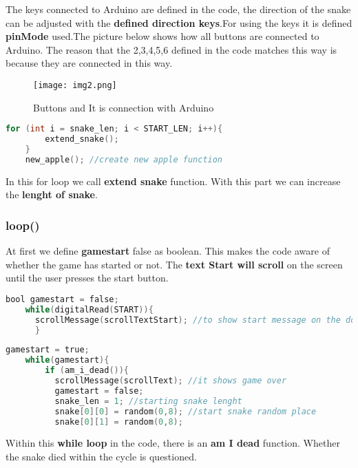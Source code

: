 \documentclass[onecolumn]{article}
\begin{document}
The keys connected to Arduino are defined in the code, the direction of the snake can be adjusted with the \textbf{defined direction keys}.For using the keys it is defined \textbf{pinMode} used.The picture below shows how all buttons are connected to Arduino. The reason that the 2,3,4,5,6 defined in the code matches this way is because they are connected in this way.

\begin{figure}[ht!]
\centering
\texttt{[image: img2.png]}
\caption{Buttons and It is connection with Arduino \label{}}
\end{figure}

\begin{lstlisting}[language=C, caption= For loop]
    for (int i = snake_len; i < START_LEN; i++){
        extend_snake(); 
    } 
    new_apple(); //create new apple function 
\end{lstlisting}

In this for loop we call \textbf{extend snake} function. With this part we can increase the \textbf{lenght of snake}. 

\subsubsection{loop()}

At first we define \textbf{gamestart} false as boolean. This makes the code aware of whether the game has started or not. The \textbf{text Start will scroll }on the screen until the user presses the start button.
  
  \begin{lstlisting}[language=C, caption= Start Message]
  bool gamestart = false;
    while(digitalRead(START)){
      scrollMessage(scrollTextStart); //to show start message on the dot matrix
      }
      \end{lstlisting}
      
    
      
      \begin{lstlisting}[language=C, caption= While Loop]
    gamestart = true;
    while(gamestart){
        if (am_i_dead()){
          scrollMessage(scrollText); //it shows game over
          gamestart = false; 
          snake_len = 1; //starting snake lenght
          snake[0][0] = random(0,8); //start snake random place
          snake[0][1] = random(0,8);
          \end{lstlisting}
          
          Within this \textbf{while loop }in the code, there is an\textbf{ am I dead} function. Whether the snake died within the cycle is questioned.
     
\end{document}

